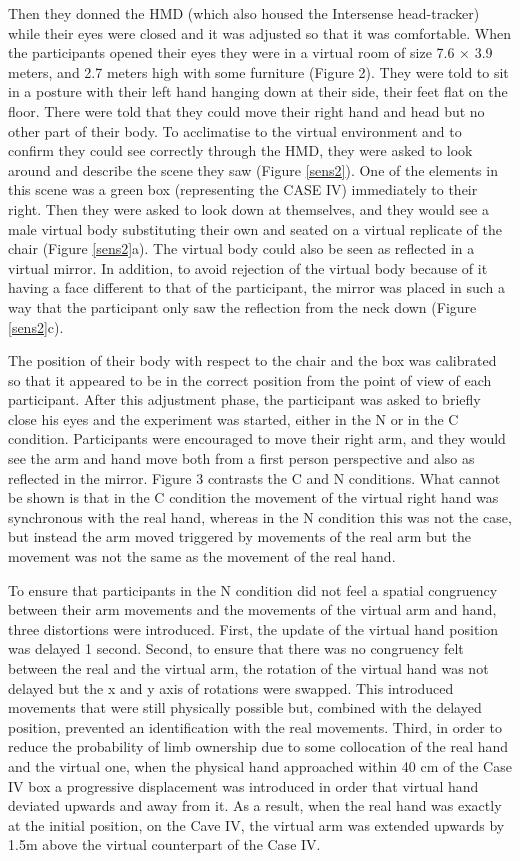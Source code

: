 \documentclass[
		twoside,openright,titlepage,numbers=noenddot,manychapters,
		headinclude,%
                footinclude=false,cleardoublepage=empty,
                BCOR=5mm,
		fontsize=11pt, %
                 enabledeprecatedfontcommands]{scrreprt}
\begin{document}
Then they donned the HMD (which also housed the Intersense head-tracker) while their eyes were closed and it was adjusted so that it was comfortable. When the participants opened their eyes they were in a virtual room of size 7.6 × 3.9 meters, and 2.7 meters high with some furniture (Figure 2). They were told to sit in a posture with their left hand hanging down at their side, their feet flat on the floor. There were told that they could move their right hand and head but no other part of their body.
To acclimatise to the virtual environment and to confirm they could see correctly through the HMD, they were asked to look around and describe the scene they saw (Figure \ref{sens2}). One of the elements in this scene was a green box (representing the CASE IV) immediately to their right. Then they were asked to look down at themselves, and they would see a male virtual body substituting their own and seated on a virtual replicate of the chair (Figure \ref{sens2}a). The virtual body could also be seen as reflected in a virtual mirror. In addition, to avoid rejection of the virtual body because of it having a face different to that of the participant, the mirror was placed in such a way that the participant only saw the reflection from the neck down (Figure \ref{sens2}c). 

The position of their body with respect to the chair and the box was calibrated so that it appeared to be in the correct position from the point of view of each participant.  After this adjustment phase, the participant was asked to briefly close his eyes and the experiment was started, either in the N or in the C condition. Participants were encouraged to move their right arm, and they would see the arm and hand move both from a first person perspective and also as reflected in the mirror. Figure 3 contrasts the C and N conditions. What cannot be shown is that in the C condition the movement of the virtual right hand was synchronous with the real hand, whereas in the N condition this was not the case, but instead the arm moved triggered by movements of the real arm but the movement was not the same as the movement of the real hand. 

To ensure that participants in the N condition did not feel a spatial congruency between their arm movements and the movements of the virtual arm and hand, three distortions were introduced. First, the update of the virtual hand position was delayed 1 second. Second, to ensure that there was no congruency felt between the real and the virtual arm, the rotation of the virtual hand was not delayed but the x and y axis of rotations were swapped. This introduced movements that were still physically possible but, combined with the delayed position, prevented an identification with the real movements. Third, in order to reduce the probability of limb ownership due to some collocation of the real hand and the virtual one, when the physical hand approached within 40 cm of the Case IV box a progressive displacement was introduced in order that virtual hand deviated upwards and away from it. As a result, when the real hand was exactly at the initial position, on the Cave IV, the virtual arm was extended upwards by 1.5m above the virtual counterpart of the Case IV.
\end{document}
